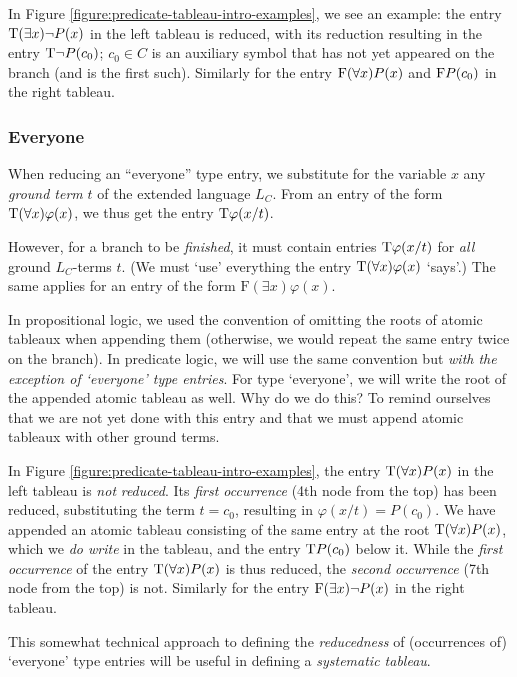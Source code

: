 In Figure \ref{figure:predicate-tableau-intro-examples}, we see an example: the entry $\mathrm{T}(\exists x)\neg P(x)$ in the left tableau is reduced, with its reduction resulting in the entry $\mathrm{T}\neg P(c_0)$; $c_0\in C$ is an auxiliary symbol that has not yet appeared on the branch (and is the first such). Similarly for the entry $\mathrm{F}(\forall x)P(x)$ and $\mathrm{F} P(c_0)$ in the right tableau.

\subsubsection{Everyone}
When reducing an ``everyone'' type entry, we substitute for the variable $x$ any \emph{ground term} $t$ of the extended language $L_C$. From an entry of the form $\mathrm{T}(\forall x)\varphi(x)$, we thus get the entry $\mathrm{T}\varphi(x/t)$.

However, for a branch to be \emph{finished}, it must contain entries $\mathrm{T}\varphi(x/t)$ for \emph{all} ground $L_C$-terms $t$. (We must `use' everything the entry $\mathrm{T}(\forall x)\varphi(x)$ `says'.) The same applies for an entry of the form $\mathrm{F}(\exists x)\varphi(x)$.

In propositional logic, we used the convention of omitting the roots of atomic tableaux when appending them (otherwise, we would repeat the same entry twice on the branch). In predicate logic, we will use the same convention but \emph{with the exception of `everyone' type entries}. For type `everyone', we will write the root of the appended atomic tableau as well. Why do we do this? To remind ourselves that we are not yet done with this entry and that we must append atomic tableaux with other ground terms.

In Figure \ref{figure:predicate-tableau-intro-examples}, the entry $\mathrm{T}(\forall x)P(x)$ in the left tableau is \emph{not} \emph{reduced}. Its \emph{first occurrence} (4th node from the top) has been reduced, substituting the term $t=c_0$, resulting in $\varphi(x/t)=P(c_0)$. We have appended an atomic tableau consisting of the same entry at the root $\mathrm{T}(\forall x)P(x)$, which we \emph{do write} in the tableau, and the entry $\mathrm{T} P(c_0)$ below it. While the \emph{first occurrence} of the entry $\mathrm{T}(\forall x)P(x)$ is thus reduced, the \emph{second occurrence} (7th node from the top) is not. Similarly for the entry $\mathrm{F}(\exists x)\neg P(x)$ in the right tableau.

This somewhat technical approach to defining the \emph{reducedness} of (occurrences of) `everyone' type entries will be useful in defining a \emph{systematic tableau}.

